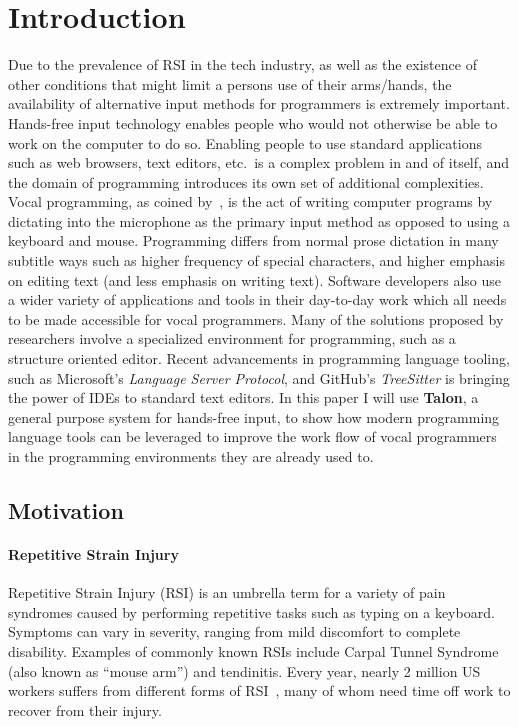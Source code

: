 \documentclass[../thesis.tex]{subfiles}
\begin{document}
\chapter{Introduction}
Due to the prevalence of RSI in the tech industry, as well as the existence of other conditions that might limit a persons use of their arms/hands, the availability
of alternative input methods for programmers is extremely important.
Hands-free input technology enables people who would not otherwise be able to work on the computer to do so.
Enabling people to use standard applications such as web browsers, text editors, etc.\ is a complex problem in and of itself, and the domain of programming
introduces its own set of additional complexities.
Vocal programming, as coined by~\parencite{Arnold}, is the act of writing computer programs by dictating into the microphone as the primary input method as opposed to using a keyboard and mouse.
Programming differs from normal prose dictation in many subtitle ways such as higher frequency of special characters, and higher emphasis on editing text (and less emphasis on writing text).
Software developers also use a wider variety of applications and tools in their day-to-day work which all needs to be made accessible for vocal programmers.
Many of the solutions proposed by researchers involve a specialized environment for programming, such as a structure oriented editor.
Recent advancements in programming language tooling, such as Microsoft's \textit{Language Server Protocol}, and GitHub's \textit{TreeSitter} is bringing the power of IDEs to standard text editors.
In this paper I will use \textbf{Talon}, a general purpose system for hands-free input, to show how modern programming language
   tools can be leveraged to improve the work flow of vocal programmers in the programming environments they are already used to.

\section{Motivation}

\subsubsection{Repetitive Strain Injury}
Repetitive Strain Injury (RSI) is an umbrella term for a variety of pain syndromes caused by
performing repetitive tasks such as typing on a keyboard.
Symptoms can vary in severity, ranging from mild discomfort to complete disability.
Examples of commonly known RSIs include Carpal Tunnel Syndrome (also known as ``mouse arm'') and tendinitis.
Every year, nearly 2 million US workers suffers from different forms of RSI~\parencite{rsi}, many of whom
need time off work to recover from their injury.
\end{document}
